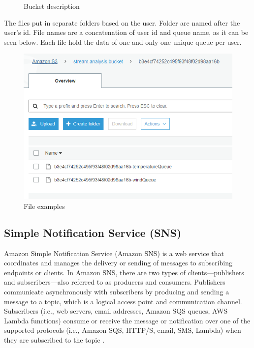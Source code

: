 \begin{figure}[p]
	\caption{Bucket description}
	\label{fig:s3}
\end{figure}

The files put in separate folders based on the user. Folder are named after the user's id. File names are a concatenation of user id and queue name, as it can be seen below. Each file hold the data of one and only one unique queue per user.

\begin{figure}[h]
	\centering
	\includegraphics[width=1\linewidth]{./images/aws_resources/S3Files.PNG}
	\caption{File examples}
	\label{fig:s3Files}
\end{figure}

\newpage

\subsection{Simple Notification Service (SNS)}
\label{chap:04:03:06}

Amazon Simple Notification Service (Amazon SNS) is a web service that coordinates and manages the delivery or sending of messages to subscribing endpoints or clients. In Amazon SNS, there are two types of clients—publishers and subscribers—also referred to as producers and consumers. Publishers communicate asynchronously with subscribers by producing and sending a message to a topic, which is a logical access point and communication channel. Subscribers (i.e., web servers, email addresses, Amazon SQS queues, AWS Lambda functions) consume or receive the message or notification over one of the supported protocols (i.e., Amazon SQS, HTTP/S, email, SMS, Lambda) when they are subscribed to the topic \cite{sns}.

